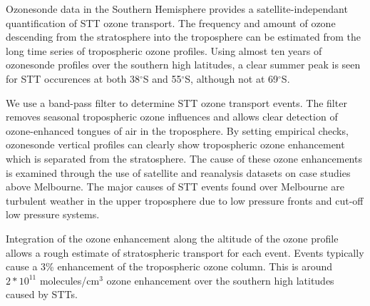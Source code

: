 \documentclass{article}
\begin{document}
  Ozonesonde data in the Southern Hemisphere provides a satellite-independant quantification of STT ozone transport.
  The frequency and amount of ozone descending from the stratosphere into the troposphere can be estimated from the long time series of tropospheric ozone profiles.
  Using almost ten years of ozonesonde profiles over the southern high latitudes, a clear summer peak is seen for STT occurences at both 38$^{\circ}$S and 55$^{\circ}$S, although not at 69$^{\circ}$S.
  
  We use a band-pass filter to determine STT ozone transport events.
  The filter removes seasonal tropospheric ozone influences and allows clear detection of ozone-enhanced tongues of air in the troposphere.
  By setting empirical checks, ozonesonde vertical profiles can clearly show tropospheric ozone enhancement which is separated from the stratosphere.
  The cause of these ozone enhancements is examined through the use of satellite and reanalysis datasets on case studies above Melbourne.
  The major causes of STT events found over Melbourne are turbulent weather in the upper troposphere due to low pressure fronts and cut-off low pressure systems.
  
  Integration of the ozone enhancement along the altitude of the ozone profile allows a rough estimate of stratospheric transport for each event.
  Events typically cause a 3\% enhancement of the tropospheric ozone column.
  This is around $2*10^{11}$ molecules/cm$^3$ ozone enhancement over the southern high latitudes caused by STTs.
  

\end{document}
